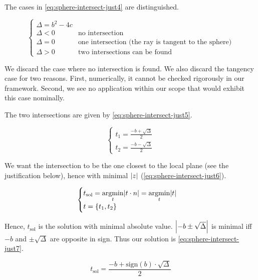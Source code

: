 The cases in \cref{eq:sphere-intersect-just4} are distinguished.

\begin{equation} \label{eq:sphere-intersect-just4} \begin{cases}
\Delta = b^2 - 4c & \\
\Delta < 0 & \text{no intersection} \\
\Delta = 0 & \text{one intersection (the ray is tangent to the sphere)} \\
\Delta > 0 & \text{two intersections can be found}
\end{cases} \end{equation}

We discard the case where no intersection is found. We also discard
the tangency case for two reasons. First, numerically, it cannot be checked
rigorously in our framework. Second, we see no application within our scope
that would exhibit this case nominally.

The two intersections are given by \cref{eq:sphere-intersect-just5}.

\begin{equation} \label{eq:sphere-intersect-just5} \begin{cases}
t_1 = \frac{-b + \sqrt{\Delta}}{2} \\
t_2 = \frac{-b - \sqrt{\Delta}}{2}
\end{cases} \end{equation}

We want the intersection to be the one closest to the local plane
(see the justification below), hence with minimal $\abs{z}$
(\cref{eq:sphere-intersect-just6}).

\begin{equation} \label{eq:sphere-intersect-just6} \begin{cases}
t_\textrm{sol} = \underset{t}{\mathrm{argmin}} \abs{t \cdot n} 
               = \underset{t}{\mathrm{argmin}} \abs{t} \\
t = \{ t_1, t_2 \}
\end{cases} \end{equation}

Hence, $t_\textrm{sol}$ is the solution with minimal absolute value.
$\abs{-b \pm \sqrt{\Delta}}$ is minimal iff
$-b$ and $\pm \sqrt{\Delta}$ are opposite in sign. Thus our
solution is \cref{eq:sphere-intersect-just7}.

\begin{equation} \label{eq:sphere-intersect-just7}
t_\textrm{sol} = \frac{-b + \textrm{sign}(b) \cdot \sqrt{\Delta}}{2}
\end{equation}

